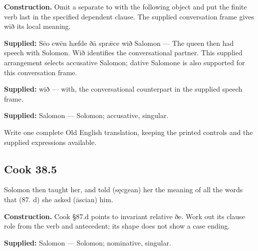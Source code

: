 \textbf{Construction.} Omit a separate to with the following object and put the finite verb last in the specified dependent clause. The supplied conversation frame gives wið its local meaning.

\textbf{Supplied:} Sēo cwēn hæfde ðā sprǣce wið Salomon — The queen then had speech with Solomon. Wið identifies the conversational partner. This supplied arrangement selects accusative Salomon; dative Salomone is also supported for this conversation frame.

\textbf{Supplied:} wið — with, the conversational counterpart in the supplied speech frame.

\textbf{Supplied:} Salomon — Solomon; accusative, singular.

Write one complete Old English translation, keeping the printed controls and the supplied expressions available.

\par\begin{minipage}{\linewidth}\raggedright
\subsection*{Cook 38.5}

Solomon then taught her, and told (sęcgean) her the meaning of all the words that (87. d) she asked (āscian) him.

\textbf{Construction.} Cook §87.d points to invariant relative ðe. Work out its clause role from the verb and antecedent; its shape does not show a case ending.

\end{minipage}\par\addvspace{4pt}

\textbf{Supplied:} Salomon — Solomon; nominative, singular.

